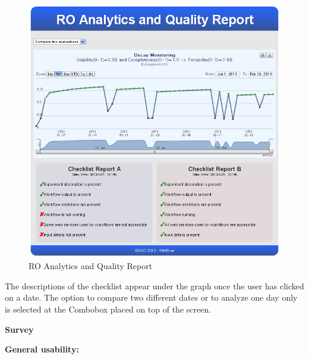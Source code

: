 \begin{figure}[htbp]
\centering
\includegraphics[width=4.7in]{figures/qualityReport2.png}
\caption{RO Analytics and Quality Report}
\end{figure}

The descriptions of the checklist appear under the graph once the user
has clicked on a date. The option to compare two different dates or to
analyze one day only is selected at the Combobox placed on top of the
screen.

\textbf{Survey}

\textbf{General usability:}

